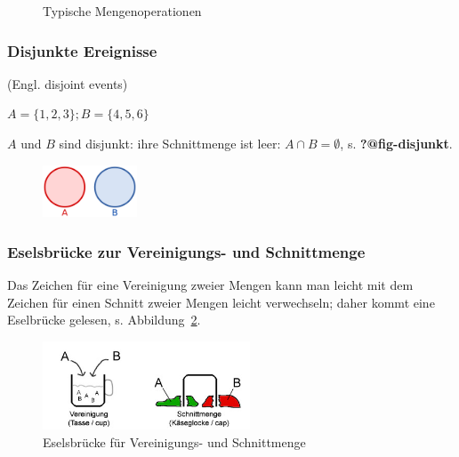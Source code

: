 \documentclass[
  a4paper,
  DIV=11]{scrreprt}
\theoremstyle{definition}
\theoremstyle{remark}
\begin{document}
\begin{figure}
\begin{minipage}[t]{0.50\linewidth}
{{}

\caption{\(A \setminus B\)}

}

\end{minipage}%

\caption{\label{fig-sets}Typische Mengenoperationen}

\end{figure}

\hypertarget{disjunkte-ereignisse}{%
\subsubsection{Disjunkte Ereignisse}\label{disjunkte-ereignisse}}

(Engl. disjoint events)

\(A= \{1,2,3\}; B= \{4,5,6\}\)

\(A\) und \(B\) sind disjunkt: ihre Schnittmenge ist leer:
\(A \cap B = \emptyset\), s. \textbf{?@fig-disjunkt}.

\begin{figure}

{\centering \includegraphics[width=0.25\textwidth,height=\textheight]{./img/2880px-Disjunkte_Mengen.svg.png}

}

\end{figure}

\hypertarget{eselsbruxfccke-zur-vereinigungs--und-schnittmenge}{%
\subsubsection{Eselsbrücke zur Vereinigungs- und
Schnittmenge}\label{eselsbruxfccke-zur-vereinigungs--und-schnittmenge}}

Das Zeichen für eine Vereinigung zweier Mengen kann man leicht mit dem
Zeichen für einen Schnitt zweier Mengen leicht verwechseln; daher kommt
eine Eselbrücke gelesen, s. Abbildung~\ref{fig-esel}.

\begin{figure}

{\centering \includegraphics[width=0.55\textwidth,height=\textheight]{./img/ven_cup_cap.jpeg}

}

\caption{\label{fig-esel}Eselsbrücke für Vereinigungs- und Schnittmenge}

\end{figure}
\end{document}
